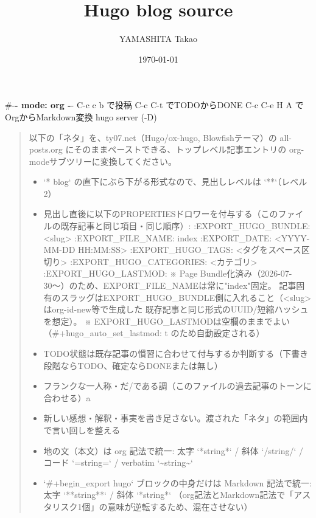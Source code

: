 \documentclass[11pt]{article}
\author{YAMASHITA Takao}
\date{\today}
\title{Hugo blog source}
\begin{document}
\maketitle
\tableofcontents

\#-\textbf{- mode: org -}-
C-c c b で投稿
C-c C-t でTODOからDONE
C-c C-e H A でOrgからMarkdown変換
hugo server (-D)

\begin{quote}
以下の「ネタ」を、ty07.net（Hugo/ox-hugo, Blowfishテーマ）の
all-posts.org にそのままペーストできる、トップレベル記事エントリの
org-modeサブツリーに変換してください。

\begin{itemize}
\item `* blog` の直下にぶら下がる形式なので、見出しレベルは `**`（レベル2）
\item 見出し直後に以下のPROPERTIESドロワーを付与する（このファイルの既存記事と同じ項目・同じ順序）:
:EXPORT\_HUGO\_BUNDLE: <slug>
:EXPORT\_FILE\_NAME: index
:EXPORT\_DATE: <YYYY-MM-DD HH:MM:SS>
:EXPORT\_HUGO\_TAGS: <タグをスペース区切り>
:EXPORT\_HUGO\_CATEGORIES: <カテゴリ>
:EXPORT\_HUGO\_LASTMOD:
※ Page Bundle化済み（2026-07-30〜）のため、EXPORT\_FILE\_NAMEは常に"index"固定。
記事固有のスラッグはEXPORT\_HUGO\_BUNDLE側に入れること（<slug>はorg-id-new等で生成した
既存記事と同じ形式のUUID/短縮ハッシュを想定）。
※ EXPORT\_HUGO\_LASTMODは空欄のままでよい（\#+hugo\_auto\_set\_lastmod: t のため自動設定される）
\item TODO状態は既存記事の慣習に合わせて付与するか判断する（下書き段階ならTODO、確定ならDONEまたは無し）
\end{itemize}

\begin{itemize}
\item フランクな一人称・だ/である調（このファイルの過去記事のトーンに合わせる）a
\item 新しい感想・解釈・事実を書き足さない。渡された「ネタ」の範囲内で言い回しを整える
\end{itemize}

\begin{itemize}
\item 地の文（本文）は org 記法で統一: 太字 `*string*` / 斜体 `/string/` / コード `=string=` / verbatim `\textasciitilde{}string\textasciitilde{}`
\item `\#+begin\_export hugo` ブロックの中身だけは Markdown 記法で統一: 太字 `**string**` / 斜体 `*string*`
（org記法とMarkdown記法で「アスタリスク1個」の意味が逆転するため、混在させない）
\end{itemize}


\end{quote}
\end{document}
